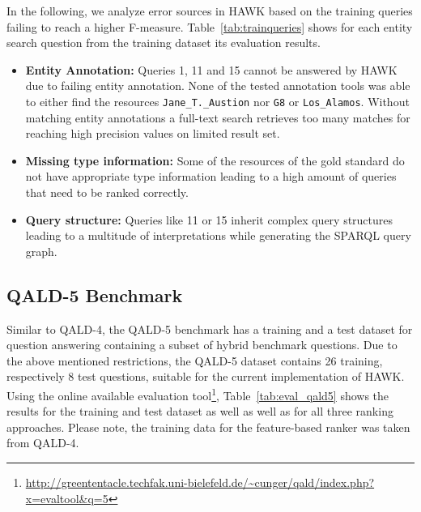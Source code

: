In the following, we analyze error sources in HAWK based on the training queries failing to reach a higher F-measure.
Table~\ref{tab:trainqueries} shows for each entity search question from the training dataset its evaluation results.
\begin{itemize}
\item \textbf{Entity Annotation: } Queries 1, 11 and 15 cannot be answered by HAWK due to failing entity annotation. None of the tested annotation tools was able to either find the resources  \texttt{Jane\_T.\_Austion} nor \texttt{G8} or \texttt{Los\_Alamos}. 
Without matching entity annotations a full-text search retrieves too many matches for reaching high precision values on limited result set.
\item \textbf{Missing type information:} Some of the resources of the gold standard do not have appropriate type information leading to a high amount of queries that need to be ranked correctly.
\item \textbf{Query structure: } Queries like 11 or 15 inherit complex query structures leading to a multitude of interpretations while generating the SPARQL query graph.
\end{itemize}




\subsection{QALD-5 Benchmark}
Similar to QALD-4, the \ac{QALD}-5 benchmark has a training and a test dataset for question answering containing a subset of hybrid benchmark questions.
Due to the above mentioned restrictions, the \ac{QALD}-5 dataset contains 26 training, respectively 8 test questions, suitable for the current implementation of HAWK.
Using the online available evaluation tool\footnote{\url{http://greententacle.techfak.uni-bielefeld.de/~cunger/qald/index.php?x=evaltool&q=5}}, Table~\ref{tab:eval_qald5} shows the results for the training and test dataset as well as well as for all three ranking approaches.
Please note, the training data  for the feature-based ranker was taken from \ac{QALD}-4.
\begin{table}[htb!]
\centering
{}
\caption{Results of \ac{QALD}-5 for different ranking methods. Number in brackets show the amount of generated answers, i.e., HAWK outputs at least one result set.}
\label{tab:eval_qald5}
\end{table}



